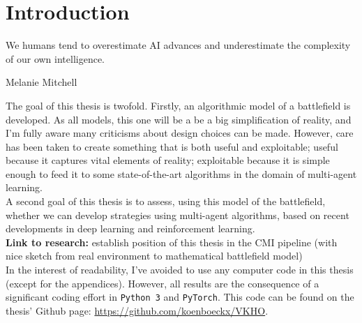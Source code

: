 \chapter{Introduction}

\epigraph{We humans tend to overestimate AI advances and underestimate the complexity of our own intelligence.} {Melanie Mitchell}

The goal of this thesis is twofold. Firstly, an algorithmic model of a battlefield is developed. As all models, this one will be a be a big simplification of reality, and I'm fully aware many criticisms about design choices can be made. However, care has been taken to create something that is both useful and exploitable; useful because it captures vital elements of reality; exploitable because it is simple enough to feed it to some state-of-the-art algorithms in the domain of multi-agent learning.\\
A second goal of this thesis is to assess, using this model of the battlefield, whether we can develop strategies using multi-agent algorithms, based on recent developments in deep learning and reinforcement learning.\\
\textbf{Link to research:} establish position of this thesis in the CMI pipeline (with nice sketch from real environment to mathematical battlefield model)\\
In the interest of readability, I've avoided to use any computer code in this thesis (except for the appendices). However, all results are the consequence of a significant coding effort in {\tt Python 3} and {\tt PyTorch}. This code can be found on the thesis' Github page: \url{https://github.com/koenboeckx/VKHO}.
